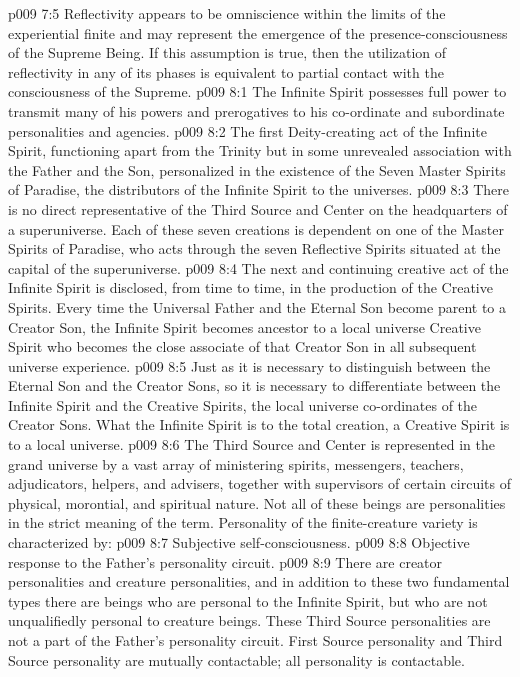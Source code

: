 \vs p009 7:5 Reflectivity appears to be omniscience within the limits of the experiential finite and may represent the emergence of the presence\hyp{}consciousness of the Supreme Being. If this assumption is true, then the utilization of reflectivity in any of its phases is equivalent to partial contact with the consciousness of the Supreme.
\vs p009 8:1 The Infinite Spirit possesses full power to transmit many of his powers and prerogatives to his co\hyp{}ordinate and subordinate personalities and agencies.
\vs p009 8:2 The first Deity\hyp{}creating act of the Infinite Spirit, functioning apart from the Trinity but in some unrevealed association with the Father and the Son, personalized in the existence of the Seven Master Spirits of Paradise, the distributors of the Infinite Spirit to the universes.
\vs p009 8:3 There is no direct representative of the Third Source and Center on the headquarters of a superuniverse. Each of these seven creations is dependent on one of the Master Spirits of Paradise, who acts through the seven Reflective Spirits situated at the capital of the superuniverse.
\vs p009 8:4 The next and continuing creative act of the Infinite Spirit is disclosed, from time to time, in the production of the Creative Spirits. Every time the Universal Father and the Eternal Son become parent to a Creator Son, the Infinite Spirit becomes ancestor to a local universe Creative Spirit who becomes the close associate of that Creator Son in all subsequent universe experience.
\vs p009 8:5 Just as it is necessary to distinguish between the Eternal Son and the Creator Sons, so it is necessary to differentiate between the Infinite Spirit and the Creative Spirits, the local universe co\hyp{}ordinates of the Creator Sons. What the Infinite Spirit is to the total creation, a Creative Spirit is to a local universe.
\vs p009 8:6 \pc The Third Source and Center is represented in the grand universe by a vast array of ministering spirits, messengers, teachers, adjudicators, helpers, and advisers, together with supervisors of certain circuits of physical, morontial, and spiritual nature. Not all of these beings are personalities in the strict meaning of the term. Personality of the finite\hyp{}creature variety is characterized by:
\vs p009 8:7 \bibnobreakspace Subjective self\hyp{}consciousness.
\vs p009 8:8 \bibnobreakspace Objective response to the Father’s personality circuit.
\vs p009 8:9 \pc There are creator personalities and creature personalities, and in addition to these two fundamental types there are  beings who are personal to the Infinite Spirit, but who are not unqualifiedly personal to creature beings. These Third Source personalities are not a part of the Father’s personality circuit. First Source personality and Third Source personality are mutually contactable; all personality is contactable.
